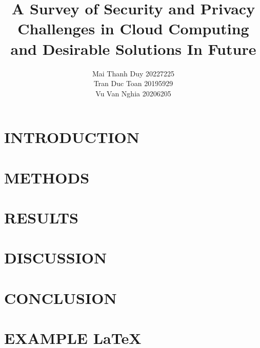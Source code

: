 \documentclass[twocolumn]{article}
\let\oldmaketitle\maketitle
\renewcommand{\maketitle}{
\thispagestyle{empty}
\oldmaketitle
}
\begin{document}
\title{A Survey of Security and Privacy Challenges in Cloud Computing and Desirable Solutions In Future}
\author{
Mai Thanh Duy 20227225 \\
Tran Duc Toan 20195929 \\
Vu Van Nghia 20206205
}
\maketitle
% 

\section{INTRODUCTION}
% 

\section{METHODS}
% 

\section{RESULTS}
% 

\section{DISCUSSION}
% 

\section{CONCLUSION}
% 

\renewcommand{\refname}{REFERENCES}


\newpage
\section{EXAMPLE \LaTeX}
% 
\end{document}
